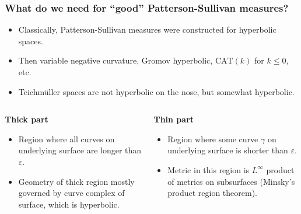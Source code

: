 \documentclass[8pt]{beamer}
\begin{document}
\begin{frame}
  \frametitle{What do we need for ``good'' Patterson-Sullivan measures?}
  \begin{itemize}
  \item<2-> Classically, Patterson-Sullivan measures were constructed for hyperbolic spaces.
  \item<3-> Then variable negative curvature, Gromov hyperbolic, $\mathrm{CAT}(k)$ for $k \leq 0$, etc.
  \item<4-> Teichmüller spaces are not hyperbolic on the nose, but somewhat hyperbolic.
  \end{itemize}
 \begin{columns}
    {
\begin{column}{0.5\textwidth}
  \begin{center}
     \textbf{Thick part}
  \end{center}
  \begin{itemize}
  \item<6-> Region where all curves on underlying surface are longer than $\varepsilon$.
  \item<7-> Geometry of thick region mostly governed by curve complex of surface, which is hyperbolic.
  \end{itemize}
  \vspace{4.4cm}
\end{column}
   }

 {
\begin{column}{0.5\textwidth}  %
    \begin{center}
      \textbf{Thin part}
     \end{center}
     \begin{itemize}
     \item<9-> Region where some curve $\gamma$ on underlying surface is shorter than $\varepsilon$.
     \item<10-> Metric in this region is $L^{\infty}$ product of metrics on subsurfaces (Minsky's product region theorem).
     \end{itemize}
\end{column}
}


\end{columns}
\end{frame}
\end{document}
